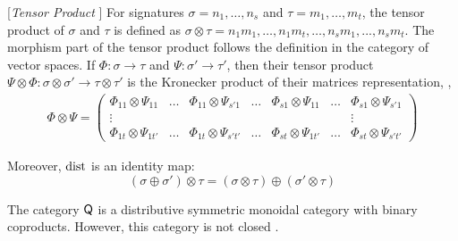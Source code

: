 \begin{definition} \label{def:tensor} [\emph{Tensor Product }]
  For signatures $\sigma = n_1, \ldots, n_s $ and $\tau= m_1, \ldots, m_t $, the tensor product of $\sigma$ and $\tau$ is defined as $\sigma \otimes \tau = n_1 m_1, \ldots ,n_1 m_t, \ldots, n_s m_1,...,n_s m_t$. 
  The morphism part of the tensor product follows the definition in the category of vector spaces. If $\Phi: \sigma \rightarrow \tau$ and $\Psi: \sigma' \rightarrow  \tau'$, then their tensor product $\Psi \otimes \Phi: \sigma \otimes \sigma' \rightarrow  \tau \otimes \tau' $ is 
the Kronecker product of their matrices representation, \ie,
\begin{align*}
  \Phi \otimes \Psi = 
  \begin{pmatrix}
  \Phi_{11} \otimes \Psi_{11} & \ldots & \Phi_{11} \otimes \Psi_{s'1} & \ldots   & \Phi_{s1} \otimes \Psi_{11} & \ldots & \Phi_{s1} \otimes \Psi_{s'1} \\
  \vdots & & & & & & \vdots \\
  \Phi_{1t} \otimes \Psi_{1t'} & \ldots & \Phi_{1t} \otimes \Psi_{s't'} & \ldots   & \Phi_{st} \otimes \Psi_{1t'} & \ldots & \Phi_{st} \otimes \Psi_{s't'}
\end{pmatrix}
\end{align*}



 Moreover, $\mathrm{dist}$ is an identity map:
  \[ (\sigma \oplus \sigma') \otimes \tau = (\sigma \otimes \tau ) \oplus (\sigma' \otimes \tau ) \]

  
\end{definition}


The category $\mathsf{Q}$ is a distributive symmetric monoidal category with binary coproducts. However, this category is not closed \cite{selinger2004b}.


